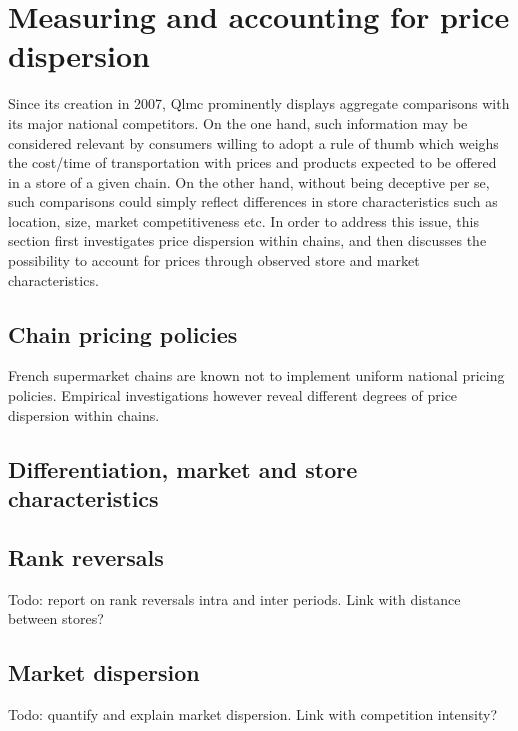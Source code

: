 \documentclass[english]{article}
\begin{document}
\section{Measuring and accounting for price dispersion}

Since its creation in 2007, Qlmc prominently displays aggregate comparisons with its major national competitors. On the one hand, such information may be considered relevant by consumers willing to adopt a rule of thumb which weighs the cost/time of transportation with prices and products expected to be offered in a store of a given chain. On the other hand, without being deceptive per se, such comparisons could simply reflect differences in store characteristics such as location, size, market competitiveness etc. In order to address this issue, this section first investigates price dispersion within chains, and then discusses the possibility to account for prices through observed store and market characteristics.

\subsection{Chain pricing policies}

French supermarket chains are known not to implement uniform national pricing policies. Empirical investigations however reveal different degrees of price dispersion within chains.

\subsection{Differentiation, market and store characteristics}

\subsection{Rank reversals}

Todo: report on rank reversals intra and inter periods. Link with distance between stores?

\subsection{Market dispersion}

Todo: quantify and explain market dispersion. Link with competition intensity?

\newpage



\newpage
\end{document}
